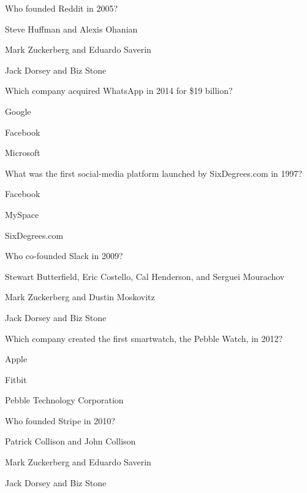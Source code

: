 \begin{enhancedmcq}{Who founded Reddit in 2005?}
\item Steve Huffman and Alexis Ohanian
\item Mark Zuckerberg and Eduardo Saverin
\item Jack Dorsey and Biz Stone

\end{enhancedmcq}
\begin{enhancedmcq}{Which company acquired WhatsApp in 2014 for \$19 billion?}
\item Google
\item Facebook
\item Microsoft

\end{enhancedmcq}
\begin{enhancedmcq}{What was the first social‑media platform launched by SixDegrees.com in 1997?}
\item Facebook
\item MySpace
\item SixDegrees.com

\end{enhancedmcq}
\begin{enhancedmcq}{Who co‑founded Slack in 2009?}
\item Stewart Butterfield, Eric Costello, Cal Henderson, and Serguei Mourachov
\item Mark Zuckerberg and Dustin Moskovitz
\item Jack Dorsey and Biz Stone

\end{enhancedmcq}
\begin{enhancedmcq}{Which company created the first smartwatch, the Pebble Watch, in 2012?}
\item Apple
\item Fitbit
\item Pebble Technology Corporation

\end{enhancedmcq}
\begin{enhancedmcq}{Who founded Stripe in 2010?}
\item Patrick Collison and John Collison
\item Mark Zuckerberg and Eduardo Saverin
\item Jack Dorsey and Biz Stone
\end{enhancedmcq}
